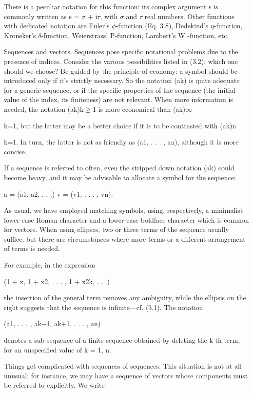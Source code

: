 \documentclass[11pt]{article}
\theoremstyle{plain}
\theoremstyle{definition}
\begin{document}
There is a peculiar notation for this function: its complex argument s is commonly written as s = $\sigma$ + i$\tau$, with $\sigma$ and $\tau$ real numbers. Other functions with dedicated notation are Euler's $\phi$-function (Eq. 3.8), Dedekind's $\eta$-function, Kroneker's $\delta$-function, Weierstrass' P-function, Lambert's W -function, etc.

Sequences and vectors. Sequences pose specific notational problems due to the presence of indices. Consider the various possibilities listed in (3.2): which one should we choose? Be guided by the principle of economy: a symbol should be introduced only if it's strictly necessary. So the notation (ak) is quite adequate for a generic sequence, or if the specific properties of the sequence (the initial value of the index, its finiteness) are not relevant. When more information is needed, the notation (ak)k$\geq$1 is more economical than (ak)$\infty$

k=1, but the latter may be a better choice if it is to be contrasted with (ak)n

k=1. In turn, the latter is not as friendly as (a1, . . . , an), although it is more concise.

If a sequence is referred to often, even the stripped down notation (ak) could become heavy, and it may be advisable to allocate a symbol for the sequence:

a = (a1, a2, . . .) v = (v1, . . . , vn).

As usual, we have employed matching symbols, using, respectively, a minimalist lower-case Roman character and a lower-case boldface character which is common for vectors. When using ellipses, two or three terms of the sequence usually suffice, but there are circumstances where more terms or a different arrangement of terms is needed.

For example, in the expression

(1 + x, 1 + x2, . . . , 1 + x2k, . . .)

the insertion of the general term removes any ambiguity, while the ellipsis on the right suggests that the sequence is infinite---cf. (3.1). The notation

(a1, . . . , ak$-$1, ak+1, . . . , an)

denotes a sub-sequence of a finite sequence obtained by deleting the k-th term, for an unspecified value of k = 1, n.

Things get complicated with sequences of sequences. This situation is not at all unusual; for instance, we may have a sequence of vectors whose components must be referred to explicitly. We write
\end{document}
